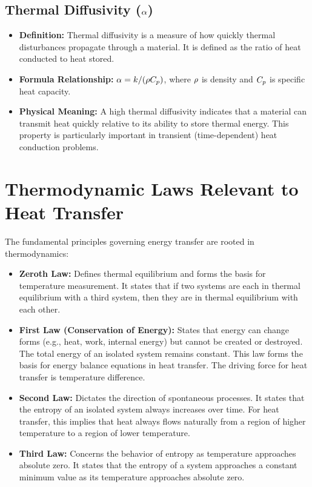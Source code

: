 \subsection{Thermal Diffusivity ($\alpha$)}
\begin{itemize}
    \item \textbf{Definition:} Thermal diffusivity is a measure of how quickly thermal disturbances propagate through a material. It is defined as the ratio of heat conducted to heat stored.
    \item \textbf{Formula Relationship:} $\alpha = k / (\rho C_p)$, where $\rho$ is density and $C_p$ is specific heat capacity.
    \item \textbf{Physical Meaning:} A high thermal diffusivity indicates that a material can transmit heat quickly relative to its ability to store thermal energy. This property is particularly important in transient (time-dependent) heat conduction problems.
\end{itemize}

\section{Thermodynamic Laws Relevant to Heat Transfer}

The fundamental principles governing energy transfer are rooted in thermodynamics:
\begin{itemize}
    \item \textbf{Zeroth Law:} Defines thermal equilibrium and forms the basis for temperature measurement. It states that if two systems are each in thermal equilibrium with a third system, then they are in thermal equilibrium with each other.
    \item \textbf{First Law (Conservation of Energy):} States that energy can change forms (e.g., heat, work, internal energy) but cannot be created or destroyed. The total energy of an isolated system remains constant. This law forms the basis for energy balance equations in heat transfer. The driving force for heat transfer is temperature difference.
    \item \textbf{Second Law:} Dictates the direction of spontaneous processes. It states that the entropy of an isolated system always increases over time. For heat transfer, this implies that heat always flows naturally from a region of higher temperature to a region of lower temperature.
    \item \textbf{Third Law:} Concerns the behavior of entropy as temperature approaches absolute zero. It states that the entropy of a system approaches a constant minimum value as its temperature approaches absolute zero.
\end{itemize}

